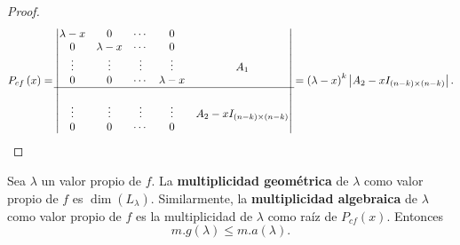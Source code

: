\begin{proof}
\[P_{cf}\left(x\right) = \begin{vmatrix} \lambda - x & 0 & \cdots & 0\\
	0 & \lambda - x& \cdots & 0  \\
	\vdots & \vdots & \vdots & \vdots & A_{1} \\
0 & 0 & \cdots & \lambda  - x \\ \hline \\
\vdots & \vdots & \vdots & \vdots & A_{2} - x I_{\left(n - k\right)\times\left(n - k\right)}  \\
0 & 0 & \cdots & 0\end{vmatrix} = \left(\lambda - x\right)^{k} \left|A_{2} - xI_{\left(n - k\right) \times \left(n - k\right)}\right|
 .\]
\end{proof}
\begin{fdefinition}[]
\normalfont Sea $\displaystyle \lambda  $ un valor propio de $\displaystyle f $. La \textbf{multiplicidad geométrica} de $\displaystyle \lambda  $ como valor propio de $\displaystyle f $ es $\displaystyle \dim\left(L_{\lambda }\right) $. Similarmente, la \textbf{multiplicidad algebraica}  de $\displaystyle \lambda  $ como valor propio de $\displaystyle f $ es la multiplicidad de $\displaystyle \lambda  $ como raíz de $\displaystyle P_{cf}\left(x\right) $. Entonces
\[m.g\left(\lambda \right) \leq m. a \left(\lambda \right) .\]
\end{fdefinition}
